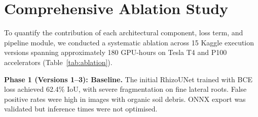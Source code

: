 \documentclass[final,3p,times,nonatbib]{elsarticle}
\begin{document}
\section{Comprehensive Ablation Study}
\label{sec:ablation}

To quantify the contribution of each architectural component, loss term, and pipeline module, we conducted a systematic ablation across 15 Kaggle execution versions spanning approximately 180 GPU-hours on Tesla T4 and P100 accelerators (Table~\ref{tab:ablation}).

\begin{table}[htbp]
\centering
\caption{\textbf{Comprehensive ablation study across 15 Kaggle versions.} Each phase introduces specific components; monotonic loss reduction confirms individual contributions.}
\label{tab:ablation}
\vspace{0.2cm}
\end{table}

\textbf{Phase 1 (Versions 1--3): Baseline.} The initial RhizoUNet trained with BCE loss achieved 62.4\% IoU, with severe fragmentation on fine lateral roots. False positive rates were high in images with organic soil debris. ONNX export was validated but inference times were not optimised.
\end{document}
